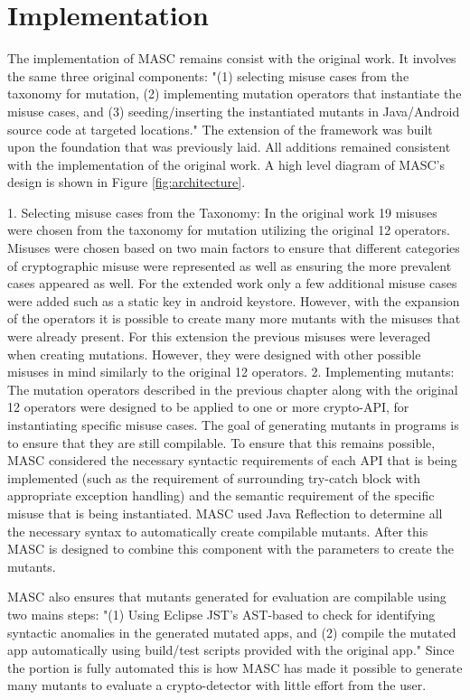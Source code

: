 \chapter{Implementation}
\label{chap_implementation}

The implementation of MASC remains consist with the original work. It involves the same three original components: "(1) selecting misuse cases from the taxonomy for mutation, (2) implementing mutation operators that instantiate the misuse cases, and (3) seeding/inserting the instantiated mutants in Java/Android source code at targeted locations." The extension of the framework was built upon the foundation that was previously laid. All additions remained consistent with the implementation of the original work. A high level diagram of MASC's design is shown in Figure \ref{fig:architecture}.

1. Selecting misuse cases from the Taxonomy: In the original work 19 misuses were chosen from the taxonomy for mutation utilizing the original 12 operators. Misuses were chosen based on two main factors to ensure that different categories of cryptographic misuse were represented as well as ensuring the more prevalent cases appeared as well. For the extended work only a few additional misuse cases were added such as a static key in android keystore. However, with the expansion of the operators it is possible to create many more mutants with the misuses that were already present. For this extension the previous misuses were leveraged when creating mutations. However, they were designed with other possible misuses in mind similarly to the original 12 operators.
2. Implementing mutants: The mutation operators described in the previous chapter along with the original 12 operators were designed to be applied to one or more crypto-API, for instantiating specific misuse cases. The goal of generating mutants in programs is to ensure that they are still compilable. To ensure that this remains possible, MASC considered the necessary syntactic requirements of each API that is being implemented (such as the requirement of surrounding try-catch block with appropriate exception handling) and the semantic requirement of the specific misuse that is being instantiated. MASC used Java Reflection to determine all the necessary syntax to automatically create compilable mutants. After this MASC is designed to combine this component with the parameters to create the mutants.

MASC also ensures that mutants generated for evaluation are compilable using two mains steps: "(1) Using Eclipse JST's AST-based to check for identifying syntactic anomalies in the generated mutated apps, and (2) compile the mutated app automatically using build/test scripts provided with the original app." Since the portion is fully automated this is how MASC has made it possible to generate many mutants to evaluate a crypto-detector with little effort from the user.


